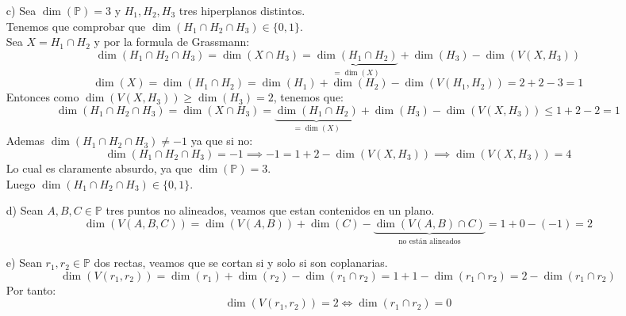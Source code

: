 {\begin{itemize}
        Luego $\dim(r \cap H) = 0$, luego $r \cap H$ es un punto.
        \item [c)] Sea $\dim(\mathbb{P}) = 3$ y $H_1, H_2, H_3$ tres hiperplanos distintos.\\
        Tenemos que comprobar que $\dim(H_1 \cap H_2 \cap H_3) \in \{0, 1\}$.\\
        Sea $X = H_1 \cap H_2$ y por la formula de Grassmann:
        \[
        \dim(H_1 \cap H_2 \cap H_3) = \dim(X \cap H_3) = \underbrace{\dim(H_1 \cap H_2)}_{=\dim(X)} + \dim(H_3) - \dim(V(X, H_3))
        \]
        \[
        \dim(X) = \dim(H_1 \cap H_2) = \dim(H_1) + \dim(H_2) - \dim(V(H_1, H_2)) = 2 + 2 - 3 = 1
        \]
        Entonces como $\dim(V(X, H_3)) \geq \dim(H_3) = 2$, tenemos que:
        \[
        \dim(H_1 \cap H_2 \cap H_3) = \dim(X \cap H_3) = \underbrace{\dim(H_1 \cap H_2)}_{=\dim(X)} + \dim(H_3) - \dim(V(X, H_3)) \leq 1 + 2 - 2 = 1
        \]
        Ademas $\dim(H_1 \cap H_2 \cap H_3) \neq -1$ ya que si no:
        \[
        \dim(H_1 \cap H_2 \cap H_3) = -1 \implies -1 = 1 + 2 - \dim(V(X, H_3)) \implies \dim(V(X, H_3)) = 4
        \]
        Lo cual es claramente absurdo, ya que $\dim(\mathbb{P}) = 3$.\\
        Luego $\dim(H_1 \cap H_2 \cap H_3) \in \{0, 1\}$.
        \item[d)] Sean $A, B, C \in \mathbb{P}$ tres puntos no alineados, veamos que estan contenidos en un plano.\\
        \[
        \dim(V(A, B, C)) = \dim(V(A, B)) + \dim(C) - \underbrace{\dim(V(A, B) \cap C)}_{\text{no están alineados}} = 1 + 0 - (-1) = 2
        \]
        \item[e)] Sean $r_1, r_2 \in \mathbb{P}$ dos rectas, veamos que se cortan si y solo si son coplanarias.\\
        \[
        \dim(V(r_1, r_2)) = \dim(r_1) + \dim(r_2) - \dim(r_1 \cap r_2) = 1 + 1 - \dim(r_1 \cap r_2) = 2 - \dim(r_1 \cap r_2)
        \]
        Por tanto:
        \[
        \dim(V(r_1, r_2)) = 2 \iff \dim(r_1 \cap r_2) = 0
        \]
    \end{itemize}
}

